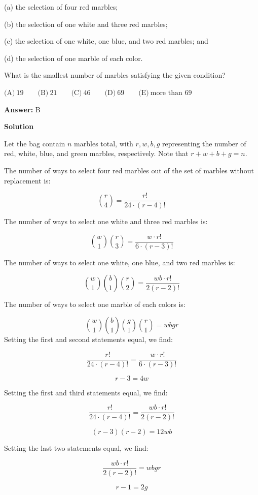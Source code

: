 \begin{enumerate}
 (a) the selection of four red marbles; 


 (b) the selection of one white and three red marbles; 


 (c) the selection of one white, one blue, and two red marbles; and 


 (d) the selection of one marble of each color. 


 What is the smallest number of marbles satisfying the given condition? 


 $\text{(A)}\ 19\qquad\text{(B)}\ 21\qquad\text{(C)}\ 46\qquad\text{(D)}\ 69\qquad\text{(E)}\ \text{more than 69}$

 \textbf{Answer: }B



\textbf{Solution}

Let the bag contain $n$ marbles total, with $r, w, b, g$ representing the number of red, white, blue, and green marbles, respectively.  Note that $r + w + b + g = n$.

 The number of ways to select four red marbles out of the set of marbles without replacement is:

 
 \[\binom{r}{4} = \frac{r!}{24\cdot (r -4)!}\]

 The number of ways to select one white and three red marbles is:

 
 \[\binom{w}{1}\binom{r}{3} = \frac{w\cdot r!}{6\cdot (r - 3)!}\] 

 The number of ways to select one white, one blue, and two red marbles is:

 
 \[\binom{w}{1}\binom{b}{1} \binom{r}{2} = \frac{wb\cdot r!}{2(r-2)!}\]

 The number of ways to select one marble of each colors is:

 
 \[\binom{w}{1}\binom{b}{1} \binom{g}{1}\binom{r}{1} = wbgr\]Setting the first and second statements equal, we find:

 
 \[\frac{r!}{24\cdot (r -4)!}  = \frac{w\cdot r!}{6\cdot (r - 3)!}\]

 \[r - 3  = 4w\]

 Setting the first and third statements equal, we find: 

 
 \[\frac{r!}{24\cdot (r -4)!} = \frac{wb\cdot r!}{2(r-2)!}\]

 \[(r-3)(r-2) = 12wb\]

 Setting the last two statements equal, we find:

 
 \[\frac{wb\cdot r!}{2(r-2)!} = wbgr\]

 \[r - 1 = 2g\]


\end{enumerate}

